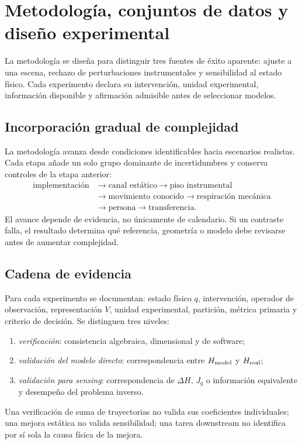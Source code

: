 \chapter{Metodología, conjuntos de datos y diseño experimental}
\label{ch:methodology}

La metodología se diseña para distinguir tres fuentes de éxito aparente: ajuste a
una escena, rechazo de perturbaciones instrumentales y sensibilidad al estado físico.
Cada experimento declara su intervención, unidad experimental, información disponible
y afirmación admisible antes de seleccionar modelos.

\section{Incorporación gradual de complejidad}

La metodología avanza desde condiciones identificables hacia escenarios realistas. Cada etapa añade un solo grupo dominante de incertidumbres y conserva controles de la etapa anterior:
\[
\begin{aligned}
\text{implementación}&\rightarrow\text{canal estático}
\rightarrow\text{piso instrumental}\\
&\rightarrow\text{movimiento conocido}
\rightarrow\text{respiración mecánica}\\
&\rightarrow\text{persona}\rightarrow\text{transferencia}.
\end{aligned}
\]
El avance depende de evidencia, no únicamente de calendario. Si un contraste falla, el resultado determina qué referencia, geometría o modelo debe revisarse antes de aumentar complejidad.

\section{Cadena de evidencia}

Para cada experimento se documentan: estado físico $q$, intervención, operador de observación, representación $V$, unidad experimental, partición, métrica primaria y criterio de decisión. Se distinguen tres niveles:
\begin{enumerate}
\item \emph{verificación}: consistencia algebraica, dimensional y de software;
\item \emph{validación del modelo directo}: correspondencia entre $H_{\rm model}$ y $H_{\rm real}$;
\item \emph{validación para sensing}: correspondencia de $\Delta H$, $J_q$ o información equivalente y desempeño del problema inverso.
\end{enumerate}
Una verificación de suma de trayectorias no valida sus coeficientes individuales; una mejora estática no valida sensibilidad; una tarea downstream no identifica por sí sola la causa física de la mejora.

